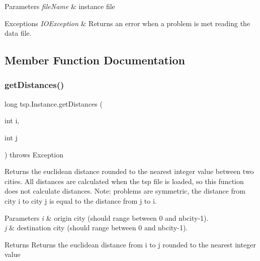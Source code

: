 \begin{DoxyParams}{Parameters}
{\em file\+Name} & instance file \\
\hline
\end{DoxyParams}

\begin{DoxyExceptions}{Exceptions}
{\em I\+O\+Exception} & Returns an error when a problem is met reading the data file. \\
\hline
\end{DoxyExceptions}


\subsection{Member Function Documentation}
\mbox{\label{classtsp_1_1_instance_a571eec5c3eea92d13a0ec59f2d983c6f}} 
\subsubsection{\texorpdfstring{get\+Distances()}{getDistances()}\hspace{0.1cm}{\footnotesize\ttfamily [1/2]}}
{\footnotesize\ttfamily long tsp.\+Instance.\+get\+Distances (\begin{DoxyParamCaption}\item[{int}]{i,  }\item[{int}]{j }\end{DoxyParamCaption}) throws Exception\hspace{0.3cm}{\ttfamily [inline]}}

Returns the euclidean distance rounded to the nearest integer value between two cities. All distances are calculated when the tsp file is loaded, so this function does not calculate distances. Note\+: problems are symmetric, the distance from city i to city j is equal to the distance from j to i.


\begin{DoxyParams}{Parameters}
{\em i} & origin city (should range between 0 and nbcity-\/1). \\
\hline
{\em j} & destination city (should range between 0 and nbcity-\/1). \\
\hline
\end{DoxyParams}
\begin{DoxyReturn}{Returns}
Returns the euclidean distance from i to j rounded to the nearest integer value 
\end{DoxyReturn}

